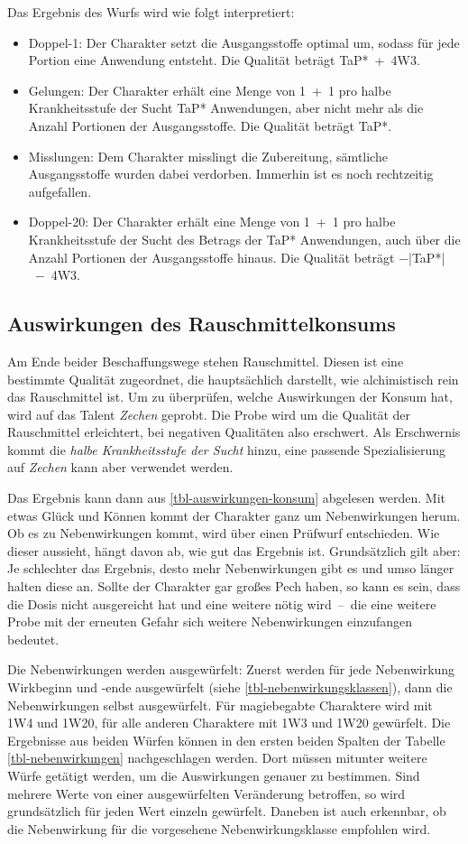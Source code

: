 Das Ergebnis des Wurfs wird wie folgt interpretiert:
\begin{itemize}
	\item Doppel-1: Der Charakter setzt die Ausgangsstoffe optimal um, sodass für jede Portion eine Anwendung entsteht. Die Qualität beträgt TaP*~+~4W3.
	\item Gelungen: Der Charakter erhält eine Menge von 1~+~1 pro halbe Krankheitsstufe der Sucht TaP* Anwendungen, aber nicht mehr als die Anzahl Portionen der Ausgangsstoffe. Die Qualität beträgt TaP*.
	\item Misslungen: Dem Charakter misslingt die Zubereitung, sämtliche Ausgangsstoffe wurden dabei verdorben. Immerhin ist es noch rechtzeitig aufgefallen.
	\item Doppel-20: Der Charakter erhält eine Menge von 1~+~1 pro halbe Krankheitsstufe der Sucht des Betrags der TaP* Anwendungen, auch über die Anzahl Portionen der Ausgangsstoffe hinaus. Die Qualität beträgt −|TaP*|~−~4W3.
\end{itemize}

\subsection{Auswirkungen des Rauschmittelkonsums\label{auswirkungen}}
Am Ende beider Beschaffungswege stehen Rauschmittel. Diesen ist eine bestimmte Qualität zugeordnet, die hauptsächlich darstellt, wie alchimistisch rein das Rauschmittel ist. Um zu überprüfen, welche Auswirkungen der Konsum hat, wird auf das Talent \emph{Zechen} geprobt. Die Probe wird um die Qualität der Rauschmittel erleichtert, bei negativen Qualitäten also erschwert. Als Erschwernis kommt die \emph{halbe Krankheitsstufe der Sucht} hinzu, eine passende Spezialisierung auf \emph{Zechen} kann aber verwendet werden.

Das Ergebnis kann dann aus \vref{tbl-auswirkungen-konsum} abgelesen werden. Mit etwas Glück und Können kommt der Charakter ganz um Nebenwirkungen herum. Ob es zu Nebenwirkungen kommt, wird über einen Prüfwurf entschieden. Wie dieser aussieht, hängt davon ab, wie gut das Ergebnis ist. Grundsätzlich gilt aber: Je schlechter das Ergebnis, desto mehr Nebenwirkungen gibt es und umso länger halten diese an. Sollte der Charakter gar großes Pech haben, so kann es sein, dass die Dosis nicht ausgereicht hat und eine weitere nötig wird~--~die eine weitere Probe mit der erneuten Gefahr sich weitere Nebenwirkungen einzufangen bedeutet.

Die Nebenwirkungen werden ausgewürfelt: Zuerst werden für jede Nebenwirkung Wirkbeginn und -ende ausgewürfelt (siehe \vref{tbl-nebenwirkungsklassen}), dann die Nebenwirkungen selbst ausgewürfelt. Für magiebegabte Charaktere wird mit 1W4 und 1W20, für alle anderen Charaktere mit 1W3 und 1W20 gewürfelt. Die Ergebnisse aus beiden Würfen können in den ersten beiden Spalten der Tabelle \vref{tbl-nebenwirkungen} nachgeschlagen werden. Dort müssen mitunter weitere Würfe getätigt werden, um die Auswirkungen genauer zu bestimmen. Sind mehrere Werte von einer ausgewürfelten Veränderung betroffen, so wird grundsätzlich für jeden Wert einzeln gewürfelt. Daneben ist auch erkennbar, ob die Nebenwirkung für die vorgesehene Nebenwirkungsklasse empfohlen wird.


